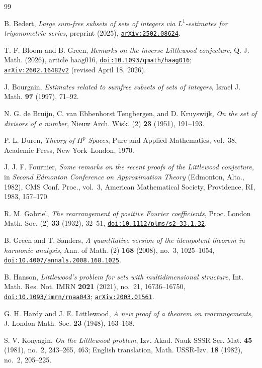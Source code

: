 \documentclass[11pt,reqno]{amsart}
\numberwithin{equation}{section}
\theoremstyle{definition}
\theoremstyle{remark}
\newcommand{\doi}[1]{\href{https://doi.org/#1}{\texttt{doi:#1}}}
\newcommand{\arxiv}[1]{\href{https://arxiv.org/abs/#1}{\texttt{arXiv:#1}}}
\begin{document}
\clearpage
\begin{thebibliography}{99}

B. Bedert, \emph{Large sum-free subsets of sets of integers via
$L^1$-estimates for trigonometric series}, preprint (2025),
\arxiv{2502.08624}.

T. F. Bloom and B. Green, \emph{Remarks on the inverse Littlewood
conjecture}, Q. J. Math. (2026), article haag016,
\doi{10.1093/qmath/haag016}; \arxiv{2602.16482v2}
(revised April 18, 2026).

J. Bourgain, \emph{Estimates related to sumfree subsets of sets of
integers}, Israel J. Math. \textbf{97} (1997), 71--92.

N. G. de Bruijn, C. van Ebbenhorst Tengbergen, and D. Kruyswijk,
\emph{On the set of divisors of a number}, Nieuw Arch. Wisk. (2)
\textbf{23} (1951), 191--193.

P. L. Duren, \emph{Theory of $H^p$ Spaces}, Pure and Applied Mathematics,
vol.~38, Academic Press, New York--London, 1970.

J. J. F. Fournier, \emph{Some remarks on the recent proofs of the
Littlewood conjecture}, in \emph{Second Edmonton Conference on
Approximation Theory} (Edmonton, Alta., 1982), CMS Conf. Proc.,
vol.~3, American Mathematical Society, Providence, RI, 1983,
157--170.

R. M. Gabriel, \emph{The rearrangement of positive Fourier coefficients},
Proc. London Math. Soc. (2) \textbf{33} (1932), 32--51,
\doi{10.1112/plms/s2-33.1.32}.

B. Green and T. Sanders, \emph{A quantitative version of the idempotent
theorem in harmonic analysis}, Ann. of Math. (2) \textbf{168} (2008),
no.~3, 1025--1054, \doi{10.4007/annals.2008.168.1025}.

B. Hanson, \emph{Littlewood's problem for sets with multidimensional
structure}, Int. Math. Res. Not. IMRN \textbf{2021} (2021), no.~21,
16736--16750, \doi{10.1093/imrn/rnaa043}; \arxiv{2003.01561}.

G. H. Hardy and J. E. Littlewood, \emph{A new proof of a theorem on
rearrangements}, J. London Math. Soc. \textbf{23} (1948), 163--168.

S. V. Konyagin, \emph{On the Littlewood problem}, Izv. Akad. Nauk SSSR
Ser. Mat. \textbf{45} (1981), no.~2, 243--265, 463; English translation,
Math. USSR-Izv. \textbf{18} (1982), no.~2, 205--225.


\end{thebibliography}
\end{document}
